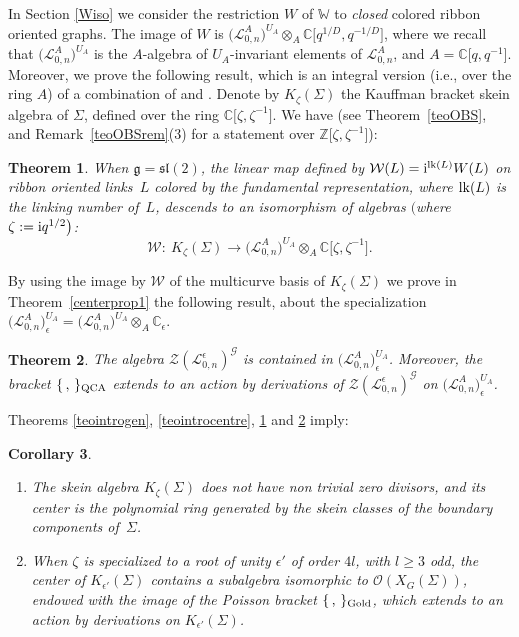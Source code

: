 \documentclass[pdftex]{sigma}%
\numberwithin{equation}{section}
\numberwithin{figure}{section}
\newtheorem{teo}{Theorem}[section]
\newtheorem{cor}[teo]{Corollary}
\newcommand{\e}{\epsilon}
\newcommand{\mc}{\mathbb{C}}
\newcommand{\mz}{\mathbb{Z}}
\newcommand{\Ll}{{\mathcal L}}
\newcommand{\ra}{\rightarrow}
\begin{document}
In Section \ref{Wiso} we consider the restriction $W$ of $\mathbb{W}$ to {\it closed} colored ribbon oriented graphs. The image of $W$ is $\big(\Ll_{0,n}^A\big)^{U_A}\otimes_A \mc\big[q^{1/D},q^{-1/D}\big]$, where we recall that $\big(\Ll_{0,n}^A\big)^{U_A}$ is the $A$-algebra of $U_A$-invariant elements of $\Ll_{0,n}^A$, and $A=\mc\big[q,q^{-1}\big]$. Moreover, we prove the following result, which is an integral version (i.e., over the ring $A$) of a combination of \cite[Theorem~10]{BFK} and \cite[Theorem~1]{BFK2}. Denote by $K_\zeta(\Sigma)$ the Kauffman bracket skein algebra of $\Sigma$, defined over the ring $\mc\big[\zeta,\zeta^{-1}\big]$. We have \big(see Theorem~\ref{teoOBS}, and Remark~\ref{teoOBSrem}(3) for a statement over $\mz\big[\zeta,\zeta^{-1}\big]$\big):
\begin{teo}\label{teointroOBS} When $\mathfrak{g}={\mathfrak{sl}}(2)$, the linear map defined by $\mathcal{W}(L) = {\rm i}^{{\rm lk}(L)}W(L)$ on ribbon oriented links~$L$ colored by the fundamental representation, where ${\rm lk}(L)$ is the linking number of~$L$, descends to an isomorphism of algebras $\big($where $\zeta := {\rm i}q^{1/2}\big)$:
\[
\mathcal{W}\colon \ K_\zeta(\Sigma)\ra \big(\Ll_{0,n}^A\big)^{U_A}\otimes_A \mc\big[\zeta,\zeta^{-1}\big].
\]
\end{teo}
By using the image by $\mathcal{W}$ of the multicurve basis of $K_\zeta(\Sigma)$ we prove in Theorem~\ref{centerprop1} the following result, about the specialization $\big(\Ll_{0,n}^A\big)^{U_A}_\e = \big(\Ll_{0,n}^A\big)^{U_A} \otimes_A \mc_\e$.
\begin{teo} \label{teointroder} The algebra $\mathcal{Z}(\Ll_{0,n}^\epsilon)^{\mathcal{G}}$ is contained in $\big(\Ll_{0,n}^A\big)^{U_A}_\e$.
Moreover, the bracket $\{\, ,\, \}_{\rm QCA}$ extends to an action by derivations of $\mathcal{Z}(\Ll_{0,n}^\epsilon)^{\mathcal{G}}$ on $\big(\Ll_{0,n}^A\big)^{U_A}_\e$.
\end{teo}

Theorems \ref{teointrogen}, \ref{teointrocentre}, \ref{teointroOBS} and \ref{teointroder} imply:
\begin{cor}\quad%
\begin{enumerate}\itemsep=0pt
\item[$(1)$] The skein algebra $K_\zeta(\Sigma)$ does not have non trivial zero divisors, and its center is the polynomial ring generated by the skein classes of the boundary components of~$\Sigma$.

\item[$(2)$] When $\zeta$ is specialized to a root of unity $\e'$ of order $4l$, with $l\geq 3$ odd, the center of $K_{\e'}(\Sigma)$ contains a subalgebra isomorphic to $\mathcal{O}(X_G(\Sigma))$, endowed with the image of the Poisson bracket $\{\, ,\, \}_{\rm Gold}$, which extends to an action by derivations on $K_{\e'}(\Sigma)$.
\end{enumerate}
\end{cor}
\end{document}

